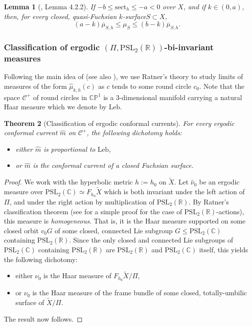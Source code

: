 \documentclass[10pt]{amsart}
\newcommand{\ksurface}{$k$\nobreakdash-surface\xspace}
\theoremstyle{plain}
\newtheorem{theorem}{Theorem}[section]
\newtheorem{lemma}[theorem]{Lemma}
\theoremstyle{definition}
\newcommand\PSL{\mathrm{PSL}_2(\mathbb{R})}
\newcommand\PSLc{\mathrm{PSL}_2(\mathbb{C})}
\newcommand\CP{\C\PP^1}
\newcommand{\C}{{\mathbb C}}
\newcommand{\PP}{{\mathbb P}}
\newcommand{\cC}{{\mathcal C}}
\let\dans\subset
\newcommand{\Leb}{\mathrm{Leb}}
\newcommand{\sect}{\mathrm{sect}}
\begin{document}
\begin{lemma}[\cite{ALS}, Lemma 4.2.2]\label{lem_comparison_area_laminar}
If $-b\leq \sect_h\leq -a<0$ over $X$, and if $k\in(0,a)$, then, for every closed, quasi-Fuchsian \ksurface $S\dans X$,
\begin{equation*}
(a-k)\overline{\mu}_{S,h}\leq\mu_S\leq(b-k)\overline{\mu}_{S,h}.
\end{equation*}
\end{lemma}

\subsubsection{Classification of ergodic $(\Pi,\PSL)$-bi-invariant measures}

Following the main idea of \cite{CMN} (see also \cite{LabourieBourbaki}), we use Ratner's theory to study limits of measures of the form $\hat\mu_{k,h}(c)$ as $c$ tends to some round circle $c_0$. Note that the space $\cC^+$ of round circles in $\CP$ is a $3$\nobreakdash-dimensional manifold carrying a natural Haar measure which we denote by $\Leb$.

\begin{theorem}[Classification of ergodic conformal currents]
\label{thm.Ratner} For every ergodic conformal current $\hat m$ on $\cC^+$, the following dichotomy holds:
\begin{itemize}
\item either $\hat m$ is proportional to $\Leb$,
\item or $\hat m$ is the conformal current of a closed Fuchsian surface.
\end{itemize}
\end{theorem}

\begin{proof}
We work with the hyperbolic metric $h:=h_0$ on $\tilde{X}$. Let $\hat\nu_0$ be an ergodic measure over $\PSLc\simeq F_{h_0}\tilde{X}$ which is both invariant under the left action of $\Pi$, and under the right action by multiplication of $\PSL$. By Ratner's classification theorem \cite{Ratner_Duke} (see \cite{Einsiedler} for a simple proof for the case of $\PSL$-actions), this measure is \emph{homogeneous}. That is, it is the Haar measure supported on some closed orbit $v_0G$ of some closed, connected Lie subgroup $G\leq\PSLc$ containing $\PSL$. Since the only closed and connected Lie subgroups of $\PSLc$ containing $\PSL$ are $\PSL$ and $\PSLc$ itself, this yields the following dichotomy:
\begin{itemize}
\item either $\nu_0$ is the Haar measure of $F_{h_0}\tilde X/\Pi$,
\item or $\nu_0$ is the Haar measure of the frame bundle of some closed, totally-umbilic surface of $\tilde X/\Pi$.
\end{itemize}
The result now follows.
\end{proof}
\end{document}
